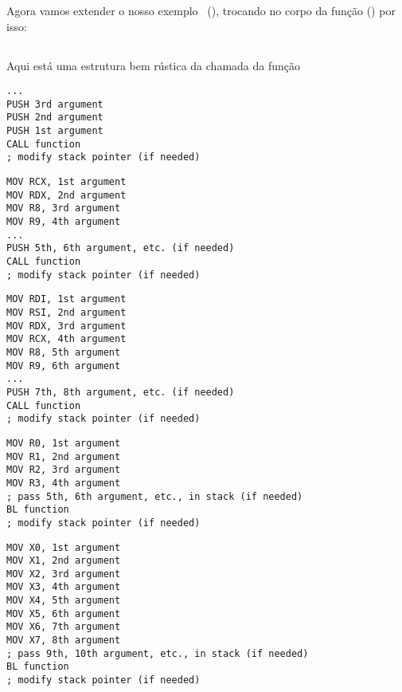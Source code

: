 \mysection{\PrintfSeveralArgumentsSectionName}

Agora vamos extender o nosso exemplo \emph{\HelloWorldSectionName}~(),
trocando \printf no corpo da função \main() por isso:







\subsection{\Conclusion{}}

Aqui está uma estrutura bem rústica da chamada da função

\begin{lstlisting}[caption=x86,style=customasmx86]
...
PUSH 3rd argument
PUSH 2nd argument
PUSH 1st argument
CALL function
; modify stack pointer (if needed)
\end{lstlisting}

\begin{lstlisting}[caption=x64 (MSVC),style=customasmx86]
MOV RCX, 1st argument
MOV RDX, 2nd argument
MOV R8, 3rd argument
MOV R9, 4th argument
...
PUSH 5th, 6th argument, etc. (if needed)
CALL function
; modify stack pointer (if needed)
\end{lstlisting}

\begin{lstlisting}[caption=x64 (GCC),style=customasmx86]
MOV RDI, 1st argument
MOV RSI, 2nd argument
MOV RDX, 3rd argument
MOV RCX, 4th argument
MOV R8, 5th argument
MOV R9, 6th argument
...
PUSH 7th, 8th argument, etc. (if needed)
CALL function
; modify stack pointer (if needed)
\end{lstlisting}

\begin{lstlisting}[caption=ARM,style=customasmARM]
MOV R0, 1st argument
MOV R1, 2nd argument
MOV R2, 3rd argument
MOV R3, 4th argument
; pass 5th, 6th argument, etc., in stack (if needed)
BL function
; modify stack pointer (if needed)
\end{lstlisting}

\begin{lstlisting}[caption=ARM64,style=customasmARM]
MOV X0, 1st argument
MOV X1, 2nd argument
MOV X2, 3rd argument
MOV X3, 4th argument
MOV X4, 5th argument
MOV X5, 6th argument
MOV X6, 7th argument
MOV X7, 8th argument
; pass 9th, 10th argument, etc., in stack (if needed)
BL function
; modify stack pointer (if needed)
\end{lstlisting}

